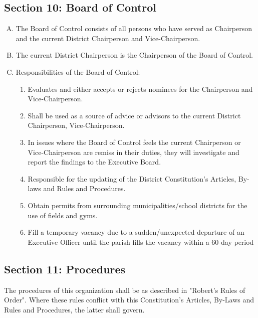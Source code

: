 \documentclass[10pt,oneside,draft]{memoir}
\begin{document}
\subsection{Section 10: Board of Control}
\begin{enumerate}[A.]
    \item The Board of Control consists of all persons who have served as Chairperson and the current District 
    Chairperson and Vice-Chairperson.
    \item The current District Chairperson is the Chairperson of the Board of Control.
    \item Responsibilities of the Board of Control:
    \begin{enumerate}[1.]
        \item Evaluates and either accepts or rejects nominees for the Chairperson and Vice-Chairperson.
        \item Shall be used as a source of advice or advisors to the current District Chairperson, Vice-Chairperson. 
        \item In issues where the Board of Control feels the current Chairperson or Vice-Chairperson are remiss in their duties, they will investigate and report the findings to the Executive Board.
        \item Responsible for the updating of the District Constitution’s Articles, By-laws and Rules and Procedures.
        \item Obtain permits from surrounding municipalities/school districts for the use of fields and gyms.
        \item Fill a temporary vacancy due to a sudden/unexpected departure of an Executive Officer until the parish fills the vacancy within a 60-day period
    \end{enumerate}
\end{enumerate}

\subsection{Section 11: Procedures}
The procedures of this organization shall be as described in "Robert's Rules of Order".  Where these rules conflict with this Constitution’s Articles, By-Laws and Rules and Procedures, the latter shall govern.
    
\end{document}
